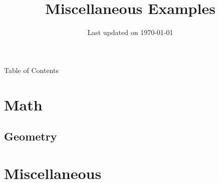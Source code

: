 \documentclass[9pt,svgnames,x11names]{beamer}
\title[\textcolor{black}{ Misc Examples }\textcolor{\thisColor}{\;2018-\the\year}]{\Huge Miscellaneous Examples}
\subtitle{} %
\institute{\small Source code at: \lb{\footnotesize\url{https://github.com/dmorgorg/LaTeX2022}}}
\author{} %
\date{\small Last updated on \today}
\begin{document}

\begin{frame}[plain]
    \titlepage
\end{frame}


\begin{frame}{Table of Contents}
    \cmini[0.5]{
        \tableofcontents
    }


    \vfill

\end{frame}

\section{Math}
\subsection{Geometry}




% 


% 

\section{Miscellaneous}
\end{document}

